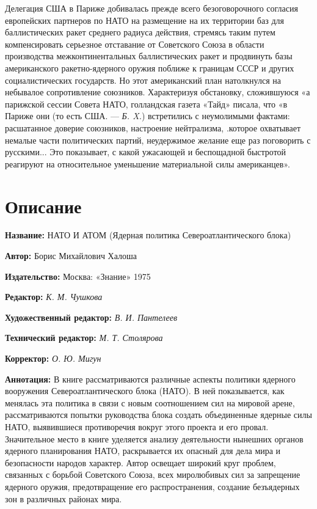 \documentclass[12pt, a4paper, openany]{book}
\begin{document}
		Делегация США в Париже добивалась прежде всего безоговорочного согласия европейских партнеров по НАТО на размещение на их территории баз для баллистических ракет среднего радиуса действия, стремясь таким путем компенсировать серьезное отставание от Советского Союза в области производства межконтинентальных баллистических ракет и продвинуть базы американского ракетно-ядерного оружия поближе к границам СССР и других социалистических государств. Но этот американский план натолкнулся на небывалое сопротивление союзников. Характеризуя обстановку, сложившуюся «а парижской сессии Совета НАТО, голландская газета «Тайд» писала, что «в Париже они (то есть США. — \textit{Б. X.}) встретились с неумолимыми фактами: расшатанное доверие союзников, настроение нейтрализма, .которое охватывает немалые части политических партий, неудержимое желание еще раз поговорить с русскими... Это показывает, с какой ужасающей и беспощадной быстротой реагируют на относительное уменьшение материальной силы американцев».
		
		
		
		
		
		
		
		
		
	
	\newpage
	\tableofcontents
	
	\thispagestyle{empty} %
	
	\newpage
	
	\setcounter{secnumdepth}{0}
	
	
		\section*{Описание}
	
	{\bf Название:} НАТО И АТОМ (Ядерная политика Североатлантического блока) 
	
{\bf Автор:} Борис Михайлович Халоша
	
{\bf Издательство:} Москва: «Знание» 1975
	
		{\bf Редактор:} \textit{К. М. Чушкова}
	
		{\bf Художественный редактор:} \textit{В. И. Пантелеев}
	
		{\bf Технический редактор:} \textit{М. Т. Столярова}
	
		{\bf Корректор:} \textit{О. Ю. Мигун}
	
		{\bf Аннотация:} В книге рассматриваются различные аспекты политики ядерного вооружения Североатлантического блока (НАТО). В ней показывается, как менялась эта политика в связи с новым соотношением сил на мировой арене, рассматриваются попытки руководства блока создать объединенные ядерные силы НАТО, выявившиеся противоречия вокруг этого проекта и его провал. Значительное место в книге уделяется анализу деятельности нынешних органов ядерного планирования НАТО, раскрывается их опасный для дела мира и безопасности народов характер. Автор освещает широкий круг проблем, связанных с борьбой Советского Союза, всех миролюбивых сил за запрещение ядерного оружия, предотвращение его распространения, создание безъядерных зон в различных районах мира. 
		\thispagestyle{empty} %

	
\end{document}
